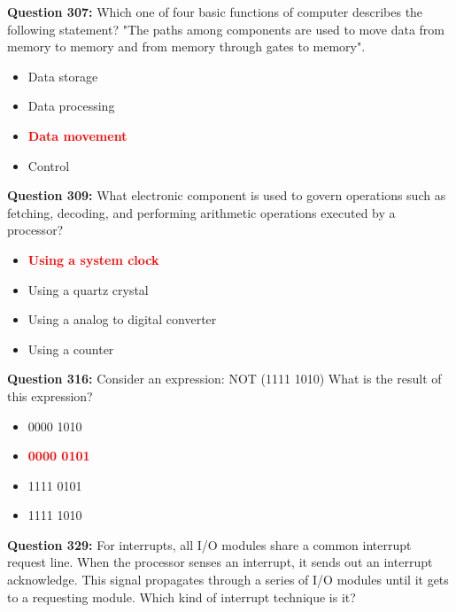 \documentclass[12pt,a4paper]{article}
\begin{document}
\vspace{0.5cm}

\textbf{Question 307:} Which one of four basic functions of computer describes the following statement? "The paths among components are used to move data from memory to memory and from memory through gates to memory".

\begin{itemize}
    \item[\textbf{A.}] Data storage
    \item[\textbf{B.}] Data processing
    \item[\textbf{C.}] \textcolor{red}{\textbf{Data movement}}
    \item[\textbf{D.}] Control
\end{itemize}

\vspace{0.5cm}

\textbf{Question 309:} What electronic component is used to govern operations such as fetching, decoding, and performing arithmetic operations executed by a processor?

\begin{itemize}
    \item[\textbf{A.}] \textcolor{red}{\textbf{Using a system clock}}
    \item[\textbf{B.}] Using a quartz crystal
    \item[\textbf{C.}] Using a analog to digital converter
    \item[\textbf{D.}] Using a counter
\end{itemize}

\vspace{0.5cm}

\textbf{Question 316:} Consider an expression: NOT (1111 1010) What is the result of this expression?

\begin{itemize}
    \item[\textbf{A.}] 0000 1010
    \item[\textbf{B.}] \textcolor{red}{\textbf{0000 0101}}
    \item[\textbf{C.}] 1111 0101
    \item[\textbf{D.}] 1111 1010
\end{itemize}

\vspace{0.5cm}

\textbf{Question 329:} For interrupts, all I/O modules share a common interrupt request line. When the processor senses an interrupt, it sends out an interrupt acknowledge. This signal propagates through a series of I/O modules until it gets to a requesting module. Which kind of interrupt technique is it?
\end{document}
